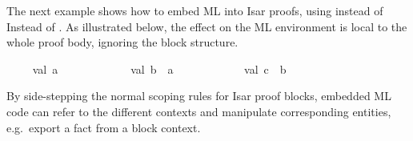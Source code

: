 \begin{isabellebody}
\begin{isamarkuptext}
  \medskip The next example shows how to embed ML into Isar proofs, using
 \hyperlink{command.ML-prf}{\mbox{}} instead of Instead of \hyperlink{command.ML}{\mbox{}}.
  As illustrated below, the effect on the ML environment is local to
  the whole proof body, ignoring the block structure.%
\end{isamarkuptext}%
\isamarkuptrue%
\isamarkupfalse%
\isanewline
%
\isadelimML
\ \ %
\endisadelimML
%
\isatagML
{}\isamarkupfalse%
\ {}\ val\ a\ {}\ {}\ {}\isanewline
\ \ \isamarkupfalse%
\isanewline
\ \ \ \ \isamarkupfalse%
\ {}\ val\ b\ {}\ a\ {}\ {}\ {}\isanewline
\ \ \isamarkupfalse%
\ %
\isanewline
\ \ \isamarkupfalse%
\ {}\ val\ c\ {}\ b\ {}\ {}\ {}\isanewline
{}\isamarkupfalse%
%
\endisatagML
{\isafoldML}%
%
\isadelimML
%
\endisadelimML
%
\begin{isamarkuptext}%
By side-stepping the normal scoping rules for Isar proof
  blocks, embedded ML code can refer to the different contexts and
  manipulate corresponding entities, e.g.\ export a fact from a block
  context.


\end{isamarkuptext}
\end{isabellebody}
